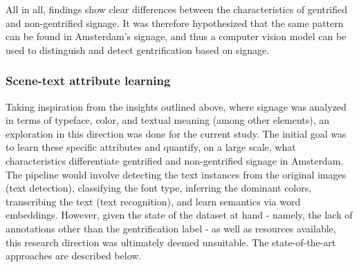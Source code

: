 All in all, findings show clear differences between the characteristics of gentrified and non-gentrified signage. It was therefore hypothesized that the same pattern can be found in Amsterdam's signage, and thus a computer vision model can be used to distinguish and detect gentrification based on signage.

\subsubsection{Scene-text attribute learning}
Taking inspiration from the insights outlined above, where signage was analyzed in terms of typeface, color, and textual meaning (among other elements), an exploration in this direction was done for the current study. The initial goal was to learn these specific attributes and quantify, on a large scale, what characteristics differentiate gentrified and non-gentrified signage in Amsterdam. The pipeline would involve detecting the text instances from the original images (text detection), classifying the font type, inferring the dominant colors, transcribing the text (text recognition), and learn semantics via word embeddings. However, given the state of the dataset at hand - namely, the lack of annotations other than the gentrification label - as well as resources available, this research direction was ultimately deemed unsuitable. The state-of-the-art approaches are described below.

